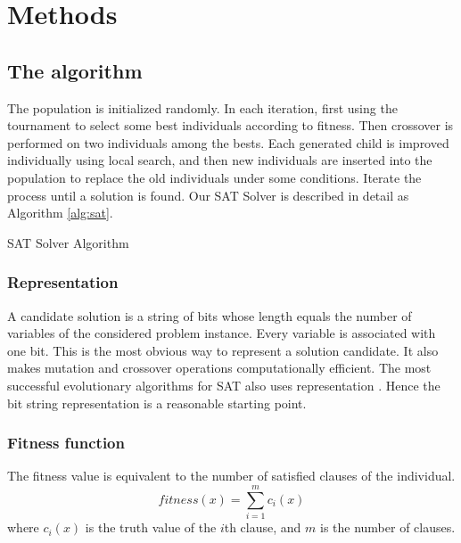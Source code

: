 	\section{Methods}
	\subsection{The algorithm}
	The population is initialized randomly.  In each iteration, first using the tournament to select some best individuals according to fitness.
	Then crossover is performed on two individuals among the bests. Each generated child is improved individually using local search, and then new individuals are inserted into the population to replace the old individuals under some conditions. Iterate the process until a solution is found.
	Our SAT Solver is described in detail as Algorithm \ref{alg:sat}.
	\begin{algorithm}
	    \SetAlgoLined
	    \caption{SAT Solver Algorithm}
	    \label{alg:sat} 
	    \BlankLine
	  \end{algorithm}
	
	\subsubsection{Representation}
	A candidate solution is a string of bits whose length equals the number of variables of the considered problem instance. Every variable is associated with one bit. This is the most obvious way to represent a solution candidate. It also makes mutation and crossover operations computationally efficient. The
	most successful evolutionary algorithms for SAT also uses representation
	\parencite{gottlieb_marchiori_rossi_2002}. Hence the bit string representation is a reasonable starting point.
	
	\subsubsection{Fitness function}
	The fitness value is equivalent to the number of satisfied clauses of the
	individual.
	\begin{equation*}
		\mathit{fitness}(x) = \sum_{i=1}^m c_i(x)
	\end{equation*}
	where $c_i(x)$ is the truth value of the $i$th
	clause, and $m$ is the number of clauses.
	
